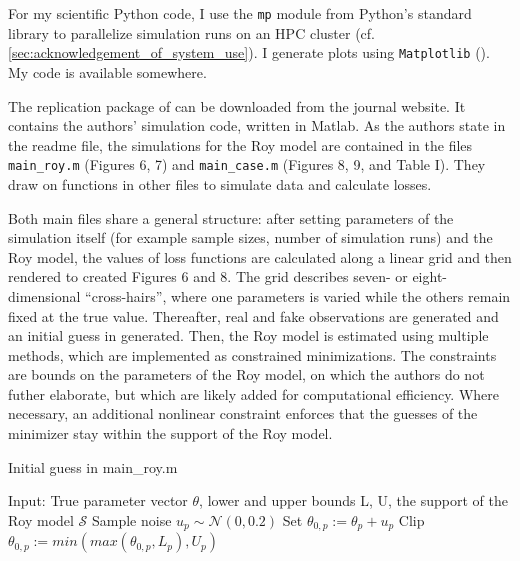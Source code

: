 For my scientific Python code, I use the \texttt{mp} module from Python's standard library to parallelize simulation runs on an HPC cluster (cf. \ref{sec:acknowledgement_of_system_use}).
I generate plots using \texttt{Matplotlib} (\cite{Matplotlib}).
My code is available somewhere. %

The replication package of \cite{kaji2023adversarial} can be downloaded from the journal website.
It contains the authors' simulation code, written in Matlab. %
As the authors state in the readme file, the simulations for the Roy model are contained in the files \texttt{main\_roy.m} (Figures 6, 7) and \texttt{main\_case.m} (Figures 8, 9, and Table I).
They draw on functions in other files to simulate data and calculate losses.

Both main files share a general structure:
after setting parameters of the simulation itself (for example sample sizes, number of simulation runs) and the Roy model, the values of loss functions are calculated along a linear grid and then rendered to created Figures 6 and 8.
The grid describes seven- or eight-dimensional ``cross-hairs'', where one parameters is varied while the others remain fixed at the true value.
Thereafter, real and fake observations are generated and an initial guess in generated.
Then, the Roy model is estimated using multiple methods, which are implemented as constrained minimizations.%
The constraints are bounds on the parameters of the Roy model, on which the authors do not futher elaborate, but which are likely added for computational efficiency. %
Where necessary, an additional nonlinear constraint enforces that the guesses of the minimizer stay within the support of the Roy model.

\begin{algorithm}
    \caption{Initial guess in main\_roy.m}
    \label{alg:theta0}
    \begin{algorithmic}[1]
        \STATE Input: True parameter vector $\theta$, lower and upper bounds L, U, the support of the Roy model $\mathcal{S}$
            \STATE Sample noise $u_p \sim \mathcal{N}(0, 0.2)$
            \STATE Set $\theta_{0,p} := \theta_p + u_p$
            \STATE Clip $\theta_{0,p} := min(max(\theta_{0,p}, L_p), U_p)$
        \ENDWHILE
    \end{algorithmic}
\end{algorithm}

